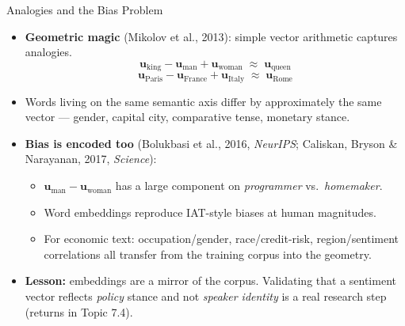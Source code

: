 \begin{frame}{Analogies and the Bias Problem}
\begin{itemize}
\item \textbf{Geometric magic} (Mikolov et al., 2013): simple vector arithmetic captures analogies.
\[
   \mathbf{u}_{\text{king}} - \mathbf{u}_{\text{man}} + \mathbf{u}_{\text{woman}} \;\approx\; \mathbf{u}_{\text{queen}}
\]
\[
   \mathbf{u}_{\text{Paris}} - \mathbf{u}_{\text{France}} + \mathbf{u}_{\text{Italy}} \;\approx\; \mathbf{u}_{\text{Rome}}
\]

\medskip
\item Words living on the same semantic axis differ by approximately the same vector --- gender, capital city, comparative tense, monetary stance.

\medskip
\item \textbf{Bias is encoded too} (Bolukbasi et al., 2016, \emph{NeurIPS}; Caliskan, Bryson \& Narayanan, 2017, \emph{Science}):
\begin{itemize}
    \item $\mathbf{u}_{\text{man}} - \mathbf{u}_{\text{woman}}$ has a large component on \emph{programmer} vs.\ \emph{homemaker}.
    \item Word embeddings reproduce IAT-style biases at human magnitudes.
    \item For economic text: occupation/gender, race/credit-risk, region/sentiment correlations all transfer from the training corpus into the geometry.
\end{itemize}

\medskip
\item \textbf{Lesson:} embeddings are a mirror of the corpus. Validating that a sentiment vector reflects \emph{policy} stance and not \emph{speaker identity} is a real research step (returns in Topic 7.4).
\end{itemize}
\end{frame}

